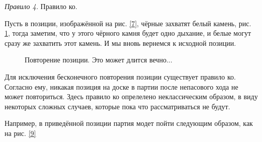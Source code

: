 \documentclass[14pt,a4paper]{extarticle}
\newcommand{\stone}[3]{\filldraw[color=black, fill=#3, very thick](#1,#2) circle(0.45);}
\newcommand{\stonelabel}[4]{\node[text=#3] at (#1,#2) {#4};}
\begin{document}
\textit{Правило 4.} Правило ко.

Пусть в позиции, изображённой на рис. \ref{7}, чёрные захватят белый камень, рис. \ref{8}, тогда заметим, что у этого чёрного камня будет одно дыхание, и белые могут сразу же захватить этот камень. И мы вновь вернемся к исходной позиции.

\begin{figure}[h!]
    \centering
    \begin{subfigure}{0.4\textwidth}
    \end{subfigure}
    \hfill
    \begin{subfigure}{0.4\textwidth}
    \end{subfigure}
    \caption{Повторение позиции. Это может длится вечно...}
    \label{8}
\end{figure}

Для исключения бесконечного повторения позиции существует правило ко.
Согласно ему, никакая позиция на доске в партии после непасового хода не может повториться.
Здесь правило ко опрелелено неклассическим образом, в виду некоторых сложных случаев, которые пока что рассматриваться не будут.

Например, в приведённой позиции партия модет пойти следующим образом, как на рис. \ref{9}
\end{document}
